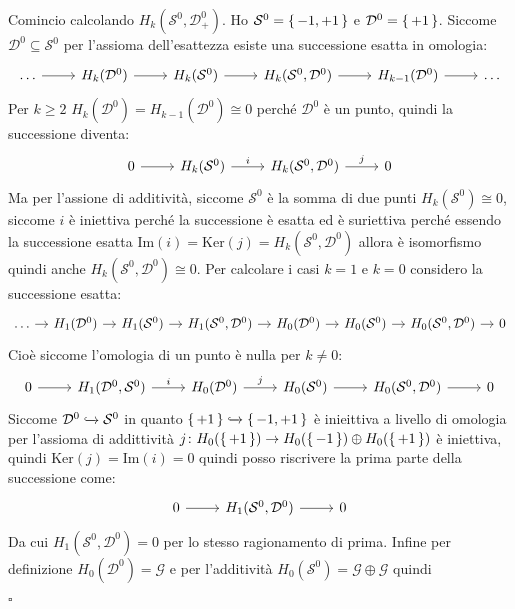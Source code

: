 \documentclass[10pt, twoside=false, x11names]{scrbook}
\newenvironment{proof}{{\textbf{Dimostrazione}:}}{\hfill $\square$}
\newcommand{\im}[1]{\mathrm{Im}( #1 )}
\renewcommand{\ker}[1]{\mathrm{Ker}( #1)}
\newcommand{\Sph}[1][]{\mathcal{S}^#1}
\newcommand{\Disk}[1][]{\mathcal{D}^#1}
\newcommand{\incl}{\xhookrightarrow{}}
\begin{document}
\begin{proof}
  Comincio calcolando $ H_k(\Sph{0}, \Disk{0}_+) $.
  Ho $ \Sph{0} = \set{-1, +1} $ e $ \Disk{0} = \set{+ 1} $.
  Siccome $ \Disk{0} \subseteq \Sph{0} $ per l'assioma dell'esattezza esiste
  una successione esatta in omologia:
  \[
    \begin{tikzcd}
      \dots \rar & H_k(\Disk{0}) \rar & H_k(\Sph{0}) \rar & H_k(\Sph{0}, \Disk{0}) \rar & H_{k-1}(\Disk{0}) \rar & \dots
    \end{tikzcd}
  \]
  Per $ k \geq 2 $ $ H_k(\Disk{0}) = H_{k-1}(\Disk{0}) \cong 0 $ perché $ \Disk{0} $ è un punto, quindi
  la successione diventa:
  \[
    \begin{tikzcd}
      0 \rar & H_k(\Sph{0}) \rar{i} & H_k(\Sph{0}, \Disk{0}) \rar{j} & 0
    \end{tikzcd}
  \]
  Ma per l'assione di additività, siccome $ \Sph{0} $ è la somma di due punti
  $ H_k(\Sph{0}) \cong 0 $, siccome $ i $ è iniettiva perché la successione è esatta
  ed è suriettiva perché essendo la successione esatta $ \im{i} = \ker{j} =  H_k(\Sph{0}, \Disk{0}) $
  allora è isomorfismo quindi anche $ H_k(\Sph{0}, \Disk{0}) \cong 0 $.
  Per calcolare i casi $ k = 1 $ e $ k = 0 $
  considero la successione esatta:
  \[
    \begin{tikzcd}[nodes={column sep=10pt, inner sep=4pt}]
      \dots \rar & H_1(\Disk{0}) \rar & H_1(\Sph{0}) \rar & H_1(\Sph{0}, \Disk{0}) \rar
      & H_0(\Disk{0}) \rar & H_{0}(\Sph{0}) \rar & H_0(\Sph{0}, \Disk{0}) \rar & 0
    \end{tikzcd}
  \]
  Cioè siccome l'omologia di un punto è nulla per $ k \not = 0 $:
  \[
    \begin{tikzcd}
       0 \rar & H_1(\Disk{0}, \Sph{0}) \rar{i}
      & H_0(\Disk{0}) \rar{j} & H_{0}(\Sph{0}) \rar & H_0(\Sph{0}, \Disk{0}) \rar & 0
    \end{tikzcd}
  \]
  Siccome $ \Disk{0} \incl \Sph{0} $ in quanto $ \set{+1} \incl \set{-1, +1} $ è inieittiva
  a livello di omologia per l'assioma di addittività $ j \colon H_0(\set{+1}) \to H_0(\set{-1}) \oplus H_0(\set{+1}) $
  è iniettiva, quindi $ \ker{j} = \im{i} = 0 $ quindi posso riscrivere la prima
  parte della successione come:
  \[
    \begin{tikzcd}
      0 \rar & H_1(\Sph{0},\Disk{0}) \rar & 0
    \end{tikzcd}
  \]
  Da cui $ H_1(\Sph{0},\Disk{0}) = 0 $ per lo stesso ragionamento di prima.
  Infine per definizione $ H_0(\Disk{0}) = \mathcal{G} $ e
  per l'additività $ H_0(\Sph{0}) = \mathcal{G} \oplus \mathcal{G} $ quindi

\end{proof}
\end{document}
